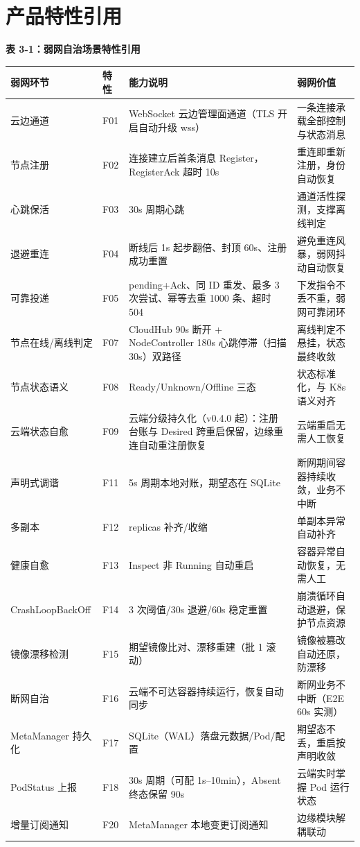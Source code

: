 \section{产品特性引用}

\textbf{表 3-1：弱网自治场景特性引用}

{\small\setlength{\tabcolsep}{3pt}
\begin{tabular}{@{}p{1.6cm}p{0.8cm}p{6.6cm}p{5.6cm}@{}}
\toprule
弱网环节 & 特性 & 能力说明 & 弱网价值\\
\midrule
云边通道 & F01 & WebSocket 云边管理面通道（TLS 开启自动升级 wss） & 一条连接承载全部控制与状态消息\\
节点注册 & F02 & 连接建立后首条消息 Register，RegisterAck 超时 10s & 重连即重新注册，身份自动恢复\\
心跳保活 & F03 & 30s 周期心跳 & 通道活性探测，支撑离线判定\\
退避重连 & F04 & 断线后 1s 起步翻倍、封顶 60s、注册成功重置 & 避免重连风暴，弱网抖动自动恢复\\
可靠投递 & F05 & pending+Ack、同 ID 重发、最多 3 次尝试、幂等去重 1000 条、超时 504 & 下发指令不丢不重，弱网可靠闭环\\
节点在线/离线判定 & F07 & CloudHub 90s 断开 + NodeController 180s 心跳停滞（扫描 30s）双路径 & 离线判定不悬挂，状态最终收敛\\
节点状态语义 & F08 & Ready/Unknown/Offline 三态 & 状态标准化，与 K8s 语义对齐\\
云端状态自愈 & F09 & 云端分级持久化（v0.4.0 起）：注册台账与 Desired 跨重启保留，边缘重连自动重注册恢复 & 云端重启无需人工恢复\\
声明式调谐 & F11 & 5s 周期本地对账，期望态在 SQLite & 断网期间容器持续收敛，业务不中断\\
多副本 & F12 & replicas 补齐/收缩 & 单副本异常自动补齐\\
健康自愈 & F13 & Inspect 非 Running 自动重启 & 容器异常自动恢复，无需人工\\
CrashLoopBackOff & F14 & 3 次阈值/30s 退避/60s 稳定重置 & 崩溃循环自动退避，保护节点资源\\
镜像漂移检测 & F15 & 期望镜像比对、漂移重建（批 1 滚动） & 镜像被篡改自动还原，防漂移\\
断网自治 & F16 & 云端不可达容器持续运行，恢复自动同步 & 断网业务不中断（E2E 60s 实测）\\
MetaManager 持久化 & F17 & SQLite（WAL）落盘元数据/Pod/配置 & 期望态不丢，重启按声明收敛\\
PodStatus 上报 & F18 & 30s 周期（可配 1s--10min），Absent 终态保留 90s & 云端实时掌握 Pod 运行状态\\
增量订阅通知 & F20 & MetaManager 本地变更订阅通知 & 边缘模块解耦联动\\
\bottomrule
\end{tabular}}

